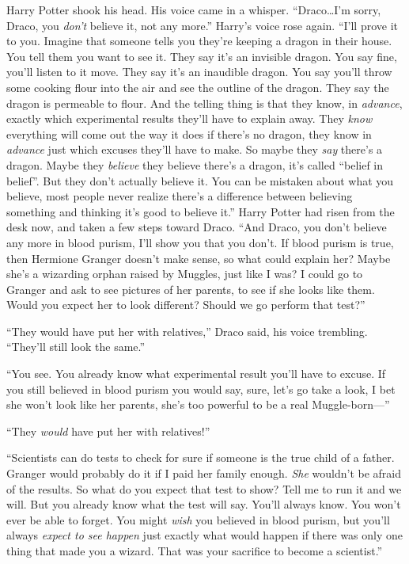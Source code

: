Harry Potter shook his head. His voice came in a whisper. “Draco…I’m sorry, Draco, you \emph{don’t} believe it, not any more.” Harry’s voice rose again. “I’ll prove it to you. Imagine that someone tells you they’re keeping a dragon in their house. You tell them you want to see it. They say it’s an invisible dragon. You say fine, you’ll listen to it move. They say it’s an inaudible dragon. You say you’ll throw some cooking flour into the air and see the outline of the dragon. They say the dragon is permeable to flour. And the telling thing is that they know, in \emph{advance}, exactly which experimental results they’ll have to explain away. They \emph{know} everything will come out the way it does if there’s no dragon, they know in \emph{advance} just which excuses they’ll have to make. So maybe they \emph{say} there’s a dragon. Maybe they \emph{believe} they believe there’s a dragon, it’s called “belief in belief”. But they don’t actually believe it. You can be mistaken about what you believe, most people never realize there’s a difference between believing something and thinking it’s good to believe it.” Harry Potter had risen from the desk now, and taken a few steps toward Draco. “And Draco, you don’t believe any more in blood purism, I’ll show you that you don’t. If blood purism is true, then Hermione Granger doesn’t make sense, so what could explain her? Maybe she’s a wizarding orphan raised by Muggles, just like I was? I could go to Granger and ask to see pictures of her parents, to see if she looks like them. Would you expect her to look different? Should we go perform that test?”

“They would have put her with relatives,” Draco said, his voice trembling. “They’ll still look the same.”

“You see. You already know what experimental result you’ll have to excuse. If you still believed in blood purism you would say, sure, let’s go take a look, I bet she won’t look like her parents, she’s too powerful to be a real Muggle-born—”

“They \emph{would} have put her with relatives!”

“Scientists can do tests to check for sure if someone is the true child of a father. Granger would probably do it if I paid her family enough. \emph{She} wouldn’t be afraid of the results. So what do you expect that test to show? Tell me to run it and we will. But you already know what the test will say. You’ll always know. You won’t ever be able to forget. You might \emph{wish} you believed in blood purism, but you’ll always \emph{expect to see happen} just exactly what would happen if there was only one thing that made you a wizard. That was your sacrifice to become a scientist.”

